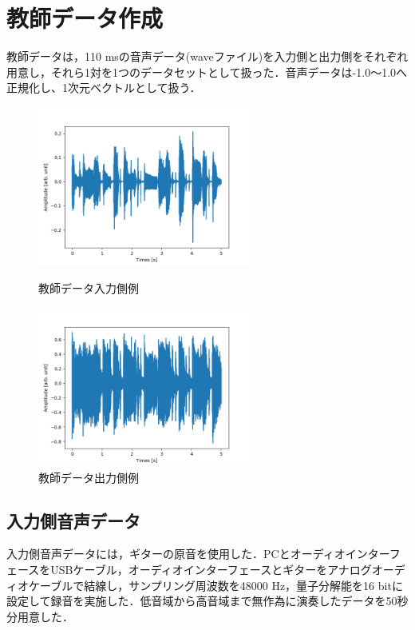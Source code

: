 \documentclass{jreport}		%
\begin{document}
\section{教師データ作成}
教師データは，110 msの音声データ(waveファイル)を入力側と出力側をそれぞれ用意し，それら1対を1つのデータセットとして扱った．音声データは-1.0～1.0へ正規化し、1次元ベクトルとして扱う．
\begin{figure}[htbp]
 \begin{minipage}{0.5\hsize}
 \begin{center}
  \includegraphics[width=70mm]{train_x0.png}
 \end{center}
 \caption{教師データ入力側例}
 \label{fig:one}
 \end{minipage}
 \begin{minipage}{0.5\hsize}
 \begin{center}
  \includegraphics[width=70mm]{train_y0.png}
 \end{center}
 \caption{教師データ出力側例}
 \label{fig:two}
 \end{minipage}
\end{figure}

\subsection{入力側音声データ}
入力側音声データには，ギターの原音を使用した．PCとオーディオインターフェースをUSBケーブル，オーディオインターフェースとギターをアナログオーディオケーブルで結線し，サンプリング周波数を48000 Hz，量子分解能を16 bitに設定して録音を実施した．低音域から高音域まで無作為に演奏したデータを50秒分用意した．
\end{document}
